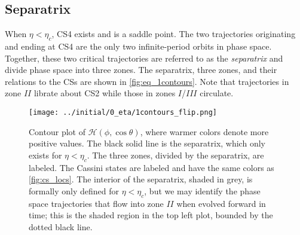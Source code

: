 \documentclass[
        fleqn,
        usenatbib,
    ]{mnras}
\newcommand*{\p}[1]{\left(#1\right)}
\begin{document}
\subsection{Separatrix}

When $\eta < \eta_c$, CS4 exists and is a saddle point. The two trajectories
originating and ending at CS4 are the only two infinite-period orbits in phase
space. Together, these two critical trajectories are referred to as the
\emph{separatrix} and divide phase space into three zones. The separatrix, three
zones, and their relations to the CSs are shown in \autoref{fig:eq_1contours}.
Note that trajectories in zone $II$ librate about CS2 while those in zones
$I$/$III$ circulate.
\begin{figure*}
    \centering
    \texttt{[image: ../initial/0\_eta/1contours\_flip.png]}
    \caption{Contour plot of $\mathcal{H}\p{\phi, \cos \theta}$, where warmer
    colors denote more positive values. The black solid line is the separatrix,
    which only exists for $\eta < \eta_c$. The three zones, divided by the
    separatrix, are labeled. The Cassini states are labeled and have the same
    colors as \autoref{fig:cs_locs}. The interior of the separatrix, shaded in
    grey, is formally only defined for $\eta < \eta_c$, but we may identify the
    phase space trajectories that flow into zone $II$ when evolved forward in
    time; this is the shaded region in the top left plot, bounded by the dotted
    black line.}\label{fig:eq_1contours}
\end{figure*}
\end{document}
